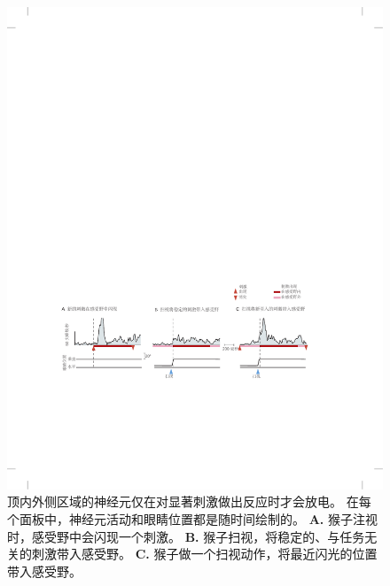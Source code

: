 \begin{figure}[htbp]
	\centering
	\includegraphics[width=1.0\linewidth]{chap25/fig_25_11}
	\caption{顶内外侧区域的神经元仅在对显著刺激做出反应时才会放电。
		在每个面板中，神经元活动和眼睛位置都是随时间绘制的。
		\textbf{A.} 猴子注视时，感受野中会闪现一个刺激。
		\textbf{B.} 猴子扫视，将稳定的、与任务无关的刺激带入感受野。
		\textbf{C.} 猴子做一个扫视动作，将最近闪光的位置带入感受野。}
	\label{fig:25_11}
\end{figure}


